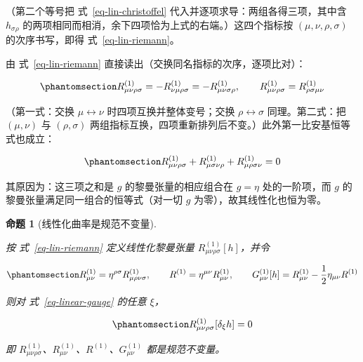 \documentclass[
  chinese,
  a4paper,
  UTF8,
  12pt,
  oneside,
  openany]{ctexbook}
\theoremstyle{plain}
\theoremstyle{plain}
\theoremstyle{plain}
\newtheorem{proposition}{命题}[chapter]
\theoremstyle{definition}
\theoremstyle{plain}
\theoremstyle{plain}
\theoremstyle{remark}
\begin{document}
（第二个等号把 式~\ref{eq-lin-christoffel}
代入并逐项求导：两组各得三项，其中含 \(h_{\sigma\rho}\)
的两项相同而相消，余下四项恰为上式的右端。）这四个指标按
\((\mu,\nu,\rho,\sigma)\) 的次序书写，即得 式~\ref{eq-lin-riemann}。

由 式~\ref{eq-lin-riemann} 直接读出（交换同名指标的次序，逐项比对）：

\begin{equation}\protect\phantomsection\label{eq-riemann-symmetries}{
R^{(1)}_{\mu\nu\rho\sigma}=-R^{(1)}_{\nu\mu\rho\sigma}=-R^{(1)}_{\mu\nu\sigma\rho},
\qquad
R^{(1)}_{\mu\nu\rho\sigma}=R^{(1)}_{\rho\sigma\mu\nu}
}\end{equation}

（第一式：交换 \(\mu\leftrightarrow\nu\) 时四项互换并整体变号；交换
\(\rho\leftrightarrow\sigma\) 同理。第二式：把 \((\mu,\nu)\) 与
\((\rho,\sigma)\)
两组指标互换，四项重新排列后不变。）此外第一比安基恒等式也成立：

\begin{equation}\protect\phantomsection\label{eq-first-bianchi}{
R^{(1)}_{\mu\nu\rho\sigma}+R^{(1)}_{\mu\sigma\nu\rho}+R^{(1)}_{\mu\rho\sigma\nu}=0
}\end{equation}

其原因为：这三项之和是 \(g\) 的黎曼张量的相应组合在 \(g=\eta\)
处的一阶项，而 \(g\) 的黎曼张量满足同一组合的恒等式（对一切 \(g\)
为零），故其线性化也恒为零。

\begin{proposition}[线性化曲率是规范不变量]\protect\hypertarget{prp-linearized-curvature}{}\label{prp-linearized-curvature}

按 式~\ref{eq-lin-riemann} 定义线性化黎曼张量
\(R^{(1)}_{\mu\nu\rho\sigma}[h]\)，并令

\begin{equation}\protect\phantomsection\label{eq-lin-einstein}{
R^{(1)}_{\mu\nu} = \eta^{\rho\sigma}R^{(1)}_{\mu\rho\nu\sigma},
\qquad
R^{(1)} = \eta^{\mu\nu}R^{(1)}_{\mu\nu},
\qquad
G^{(1)}_{\mu\nu}[h] = R^{(1)}_{\mu\nu}-\frac{1}{2}\eta_{\mu\nu}R^{(1)}
}\end{equation}

则对 式~\ref{eq-linear-gauge} 的任意 \(\xi\)，

\begin{equation}\protect\phantomsection\label{eq-lin-gauge-invariance}{
R^{(1)}_{\mu\nu\rho\sigma}[\delta_{\xi}h] = 0
}\end{equation}

即
\(R^{(1)}_{\mu\nu\rho\sigma}\)、\(R^{(1)}_{\mu\nu}\)、\(R^{(1)}\)、\(G^{(1)}_{\mu\nu}\)
都是规范不变量。

\end{proposition}
\end{document}

